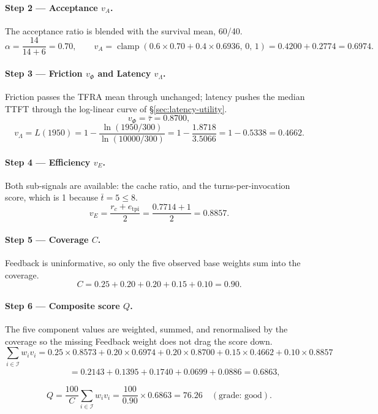\documentclass[11pt,a4paper]{article}
\newcommand{\calI}{\mathcal{I}}
\newcommand{\clamp}[3]{\operatorname{clamp}\!\left(#1,\,#2,\,#3\right)}
\begin{document}
\paragraph{Step 2 --- Acceptance $v_A$.}
The acceptance ratio is blended with the survival mean, 60/40.
\[
  \alpha = \frac{14}{14+6} = 0.70,
  \qquad
  v_A = \clamp{0.6 \times 0.70 + 0.4 \times 0.6936}{0}{1}
      = 0.4200 + 0.2774
      = 0.6974.
\]

\paragraph{Step 3 --- Friction $v_\Phi$ and Latency $v_\Lambda$.}
Friction passes the TFRA mean through unchanged; latency pushes the median
TTFT through the log-linear curve of \S\ref{sec:latency-utility}.
\[
  v_\Phi = \bar{\tau} = 0.8700,
\]
\[
  v_\Lambda = L(1950)
            = 1 - \frac{\ln(1950/300)}{\ln(10000/300)}
            = 1 - \frac{1.8718}{3.5066}
            = 1 - 0.5338
            = 0.4662.
\]

\paragraph{Step 4 --- Efficiency $v_E$.}
Both sub-signals are available: the cache ratio, and the
turns-per-invocation score, which is 1 because $\bar{t} = 5 \leq 8$.
\[
  v_E = \frac{r_c + e_{\mathrm{tpi}}}{2}
      = \frac{0.7714 + 1}{2}
      = 0.8857.
\]

\paragraph{Step 5 --- Coverage $C$.}
Feedback is uninformative, so only the five observed base weights sum
into the coverage.
\[
  C = 0.25 + 0.20 + 0.20 + 0.15 + 0.10 = 0.90.
\]

\paragraph{Step 6 --- Composite score $Q$.}
The five component values are weighted, summed, and renormalised by the
coverage so the missing Feedback weight does not drag the score down.
\[
  \sum_{i \in \calI} w_i v_i
  = 0.25 \times 0.8573
  + 0.20 \times 0.6974
  + 0.20 \times 0.8700
  + 0.15 \times 0.4662
  + 0.10 \times 0.8857
\]
\[
  \phantom{\sum_{i \in \calI} w_i v_i}
  = 0.2143 + 0.1395 + 0.1740 + 0.0699 + 0.0886
  = 0.6863,
\]
\[
  Q = \frac{100}{C} \sum_{i \in \calI} w_i v_i
    = \frac{100}{0.90} \times 0.6863
    = 76.26 \quad (\text{grade: good}).
\]
\end{document}

